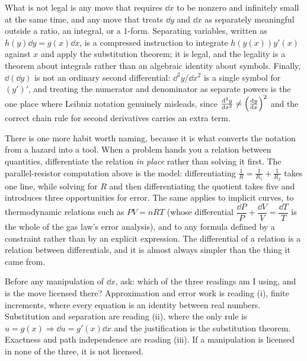 What is not legal is any move that requires $\dd x$ to be nonzero and infinitely small at the same time, and any move that treats $\dd y$ and $\dd x$ as separately meaningful outside a ratio, an integral, or a $1$-form. Separating variables, written as $h(y)\dd y=g(x)\dd x$, is a compressed instruction to integrate $h(y(x))y'(x)$ against $x$ and apply the substitution theorem; it is legal, and the legality is a theorem about integrals rather than an algebraic identity about symbols. Finally, $\dd(\dd y)$ is not an ordinary second differential: $\dd^{2}y/\dd x^{2}$ is a single symbol for $(y')'$, and treating the numerator and denominator as separate powers is the one place where Leibniz notation genuinely misleads, since $\frac{\mathrm{d}^{2}y}{\mathrm{d}x^{2}}\neq\left(\frac{\mathrm{d}y}{\mathrm{d}x}\right)^{2}$ and the correct chain rule for second derivatives carries an extra term.

There is one more habit worth naming, because it is what converts the notation from a hazard into a tool. When a problem hands you a relation between quantities, differentiate the relation \emph{in place} rather than solving it first. The parallel-resistor computation above is the model: differentiating $\tfrac1R=\tfrac1{R_1}+\tfrac1{R_2}$ takes one line, while solving for $R$ and then differentiating the quotient takes five and introduces three opportunities for error. The same applies to implicit curves, to thermodynamic relations such as $PV=nRT$ (whose differential $\dfrac{\dd P}{P}+\dfrac{\dd V}{V}=\dfrac{\dd T}{T}$ is the whole of the gas law's error analysis), and to any formula defined by a constraint rather than by an explicit expression. The differential of a relation is a relation between differentials, and it is almost always simpler than the thing it came from.

\begin{keynote}
Before any manipulation of $\dd x$, ask: which of the three readings am I using, and is the move licensed there? Approximation and error work is reading (i), finite increments, where every equation is an identity between real numbers. Substitution and separation are reading (ii), where the only rule is $u=g(x)\Rightarrow\dd u=g'(x)\dd x$ and the justification is the substitution theorem. Exactness and path independence are reading (iii). If a manipulation is licensed in none of the three, it is not licensed.
\end{keynote}

